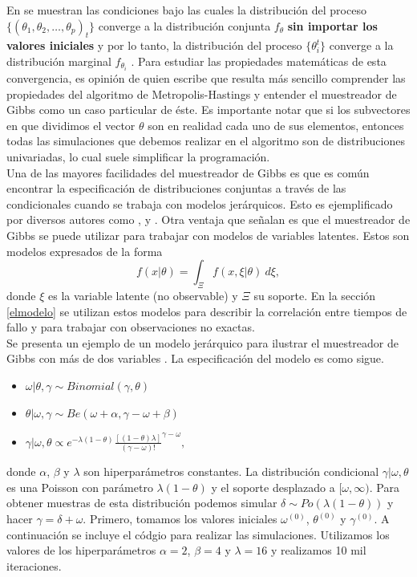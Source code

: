\documentclass[11pt,a4paper]{article}
\begin{document}
En \citet{geman} se muestran las condiciones bajo las cuales la distribución del proceso $\lbrace (\theta_1, \theta_2, \dots, \theta_p)_t\rbrace$ converge a la distribución conjunta $f_{\theta}$ \textbf{sin importar los valores iniciales} y por lo tanto, la distribución del proceso $\lbrace \theta_i^t \rbrace$ converge a la distribución marginal $f_{\theta_i}$ \citep{gelfand_smith}. Para estudiar las propiedades matemáticas de esta convergencia, es opinión de quien escribe que resulta más sencillo comprender las propiedades del algoritmo de Metropolis-Hastings y entender el muestreador de Gibbs como un caso particular de éste. Es importante notar que si los subvectores en que dividimos el vector $\theta$ son en realidad cada uno de sus elementos, entonces todas las simulaciones que debemos realizar en el algoritmo son de distribuciones univariadas, lo cual suele simplificar la programación.\\

Una de las mayores facilidades del muestreador de Gibbs es que es común encontrar la especificación de distribuciones conjuntas a través de las condicionales cuando se trabaja con modelos jerárquicos. Esto es ejemplificado por diversos autores como \citet{casella}, \citet{gelman} y \citet{gelfand_smith}. Otra ventaja que señalan \citet{casella} es que el muestreador de Gibbs se puede utilizar para trabajar con modelos de variables latentes. Estos son modelos expresados de la forma $$f(x| \theta) = \int_\Xi f(x, \xi | \theta) \ d\xi,$$ donde $\xi$ es la variable latente (no observable) y $\Xi$ su soporte. En la sección \ref{elmodelo} se utilizan estos modelos para describir la correlación entre tiempos de fallo y para trabajar con observaciones no exactas.\\

Se presenta un ejemplo de un modelo jerárquico para ilustrar el muestreador de Gibbs con más de dos variables \citep{casella_gs}. La especificación del modelo es como sigue.
\begin{itemize}
\item $\omega|\theta, \gamma \sim Binomial(\gamma, \theta)$
\item $\theta | \omega, \gamma \sim Be(\omega + \alpha, \gamma - \omega + \beta)$
\item $\gamma | \omega, \theta \propto e^{-\lambda(1-\theta)}\frac{[(1-\theta)\lambda]}{(\gamma - \omega)!}^{\gamma - \omega},$
\end{itemize}
donde $\alpha$, $\beta$ y $\lambda$ son hiperparámetros constantes. La distribución condicional $\gamma | \omega, \theta$ es una Poisson con parámetro $\lambda(1-\theta)$ y el soporte desplazado a $[\omega, \infty)$. Para obtener muestras de esta distribución podemos simular $\delta \sim Po(\lambda(1-\theta))$ y hacer $\gamma = \delta + \omega$. Primero, tomamos los valores iniciales $\omega^{(0)}$, $\theta^{(0)}$ y $\gamma^{(0)}$. A continuación se incluye el códgio para realizar las simulaciones. Utilizamos los valores de los hiperparámetros $\alpha = 2$, $\beta = 4$ y $\lambda = 16$ y realizamos 10 mil iteraciones.\\
\end{document}
